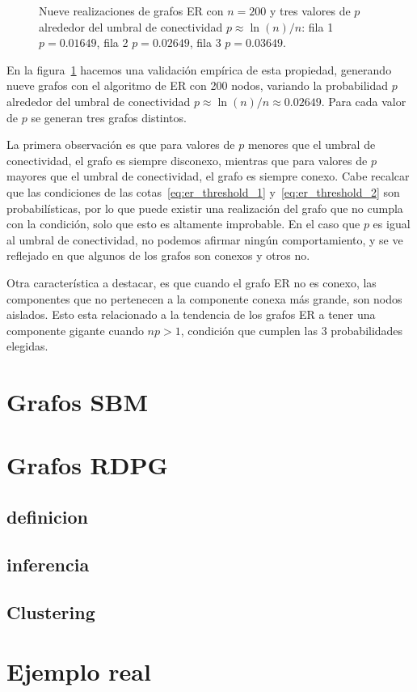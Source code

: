 \documentclass{article}
\begin{document}
\begin{figure}[htb]
    \caption{Nueve realizaciones de grafos ER con $n=200$ y tres valores de $p$ alrededor del umbral de conectividad $p \approx \ln(n)/n$: fila 1 $p=0.01649$, fila 2 $p=0.02649$, fila 3 $p=0.03649$.}
    \label{fig:er_threshold}
\end{figure}

En la figura~\ref{fig:er_threshold} hacemos una validación empírica de esta propiedad, generando nueve grafos
con el algoritmo de ER con 200 nodos, variando la probabilidad $p$ alrededor del umbral de conectividad $p \approx \ln(n)/n \approx 0.02649$. Para cada valor de $p$ se generan tres grafos distintos.

La primera observación es que para valores de $p$ menores que el umbral de conectividad, el grafo es siempre disconexo, mientras que para valores de $p$ mayores que el umbral de conectividad, el grafo es siempre conexo. Cabe recalcar que las condiciones de las cotas~\eqref{eq:er_threshold_1} y~\eqref{eq:er_threshold_2} son probabilísticas, por lo que puede existir una realización del grafo que no cumpla con la condición, solo
que esto es altamente improbable. En el caso que $p$ es igual al umbral de conectividad, no podemos afirmar ningún comportamiento, y se ve reflejado en que algunos de los grafos son conexos y otros no. 

Otra característica a destacar, es que cuando el grafo ER no es conexo, las componentes que no pertenecen
a la componente conexa más grande, son nodos aislados. Esto esta relacionado a la tendencia de los grafos ER
a tener una componente gigante cuando $np>1$, condición que cumplen las 3 probabilidades elegidas.

\section{Grafos SBM}

\section{Grafos RDPG}

\subsection{definicion}

\subsection{inferencia}

\subsection{Clustering }

\section{Ejemplo real}



\end{document}
